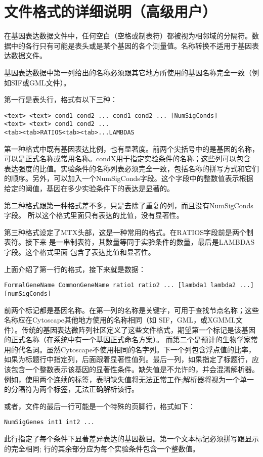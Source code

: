 \section{文件格式的详细说明（高级用户）}
在基因表达数据文件中，任何空白（空格或制表符）都被视为相邻域的分隔符。数据中的各行只有可能是表头或是某个基因的各个测量值。名称转换不适用于基因表达数据文件。

基因表达数据中第一列给出的名称必须跟其它地方所使用的基因名称完全一致（例如SIF或GML文件）。

第一行是表头行，格式有以下三种：
\begin{verbatim}
<text> <text> cond1 cond2 ... cond1 cond2 ... [NumSigConds]
<text> <text> cond1 cond2 ...
<tab><tab>RATIOS<tab><tab>...LAMBDAS
\end{verbatim}
第一种格式中既有基因表达比例，也有显著度。前两个尖括号中的是基因的名称，
可以是正式名称或常用名称。condX用于指定实验条件的名称；这些列可以包含
表达强度的比值。实验条件的名称列表必须完全一致，包括名称的拼写方式和它们
的顺序。另外，可以加入一个NumSigConds字段。这个字段中的整数值表示根据
给定的阈值，基因在多少实验条件下的表达是显著的。

第二种格式跟第一种格式差不多，只是去除了重复的列，而且没有NumSigConds字段。
所以这个格式里面只有表达的比值，没有显著性。

第三种格式设定了MTX头部，这是一种常用的格式。在RATIOS字段前是两个制表符。接下来
是一串制表符，其数量等同于实验条件的数量，最后是LAMBDAS字段。这个格式里面
包含了表达比值和显著性。

上面介绍了第一行的格式，接下来就是数据：
\begin{verbatim}
FormalGeneName CommonGeneName ratio1 ratio2 ... [lambda1 lambda2 ...] [numSigConds]
\end{verbatim}

前两个标记都是基因名称。在第一列的名称是关键字，可用于查找节点名称；这些名称应在Cytoscape其他地方使用的名称相同（如  SIF，GML，或XGMML文件）。传统的基因表达微阵列社区定义了这些文件格式，期望第一个标记是该基因的正式名称（在系统中有一个基因正式命名方案）。 而第二个是预计的生物学家常用的代名词。虽然Cytoscape不使用相同的名字列。下一个列包含浮点值的比率，如果为标题行中指定列，后面跟着显著性值列。最后一列，如果指定了标题行，应该包含一个整数表示该基因的显著性条件。缺失值是不允许的，并会混淆解析器。例如，使用两个连续的标签，表明缺失值将无法正常工作;解析器将视为一个单一的分隔符为两个标签，无法正确解析该行。

或者，文件的最后一行可能是一个特殊的页脚行，格式如下：

\begin{verbatim}
NumSigGenes int1 int2 ...
\end{verbatim}
此行指定了每个条件下显著差异表达的基因数目。第一个文本标记必须拼写跟显示的完全相同; 行的其余部分应为每个实验条件包含一个整数值。

